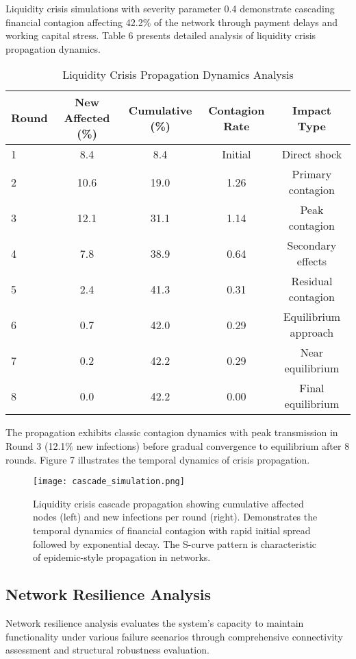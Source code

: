 \documentclass[a4 paper, 11pt,twoside]{article}
\newcommand{\0}{\Bf{0}}
\theoremstyle{definition}
\begin{document}
Liquidity crisis simulations with severity parameter 0.4 demonstrate cascading financial contagion affecting 42.2\% of the network through payment delays and working capital stress. Table 6 presents detailed analysis of liquidity crisis propagation dynamics.

\begin{table}[H]
\centering
\caption{Liquidity Crisis Propagation Dynamics Analysis}
\begin{tabular}{@{}lcccc@{}}
\toprule
\textbf{Round} & \textbf{New Affected (\%)} & \textbf{Cumulative (\%)} & \textbf{Contagion Rate} & \textbf{Impact Type} \\
\midrule
1 & 8.4 & 8.4 & Initial & Direct shock \\
2 & 10.6 & 19.0 & 1.26 & Primary contagion \\
3 & 12.1 & 31.1 & 1.14 & Peak contagion \\
4 & 7.8 & 38.9 & 0.64 & Secondary effects \\
5 & 2.4 & 41.3 & 0.31 & Residual contagion \\
6 & 0.7 & 42.0 & 0.29 & Equilibrium approach \\
7 & 0.2 & 42.2 & 0.29 & Near equilibrium \\
8 & 0.0 & 42.2 & 0.00 & Final equilibrium \\
\bottomrule
\end{tabular}
\end{table}

The propagation exhibits classic contagion dynamics with peak transmission in Round 3 (12.1\% new infections) before gradual convergence to equilibrium after 8 rounds. Figure 7 illustrates the temporal dynamics of crisis propagation.

\begin{figure}[H]
\centering
\texttt{[image: cascade\_simulation.png]}
\caption{Liquidity crisis cascade propagation showing cumulative affected nodes (left) and new infections per round (right). Demonstrates the temporal dynamics of financial contagion with rapid initial spread followed by exponential decay. The S-curve pattern is characteristic of epidemic-style propagation in networks.}
\end{figure}

\subsection{Network Resilience Analysis}

Network resilience analysis evaluates the system's capacity to maintain functionality under various failure scenarios through comprehensive connectivity assessment and structural robustness evaluation.
\end{document}

